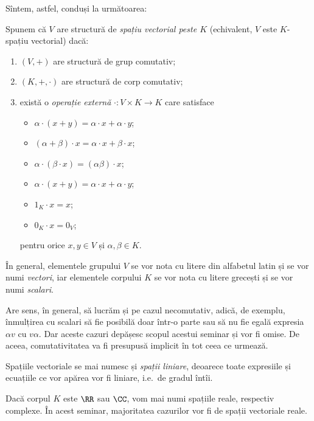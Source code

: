 Sîntem, astfel, conduși la următoarea:
\begin{definition}\label{def:sp-vect}
    Spunem că $ V $ are structură de \emph{spațiu vectorial peste $ K $} (echivalent,
    $ V $ este $ K $-spațiu vectorial) dacă:
    \begin{enumerate}
        \item $ (V, +) $ are structură de grup comutativ;
        \item $ (K, +, \cdot) $ are structură de corp comutativ;
        \item există o \emph{operație externă} $ \cdot : V \times K \to K $ care satisface
            \begin{itemize}
                \item $ \alpha \cdot (x + y) = \alpha \cdot x + \alpha \cdot y $;
                \item $ (\alpha + \beta) \cdot x = \alpha \cdot x + \beta \cdot x $;
                \item $ \alpha \cdot (\beta \cdot x) = (\alpha \beta) \cdot x $;
                \item $ \alpha \cdot (x + y) = \alpha \cdot x + \alpha \cdot y $;
                \item $ 1_K \cdot x = x $;
                \item $ 0_K \cdot x = 0_V $;
            \end{itemize}
            pentru orice $ x, y \in V $ și $ \alpha, \beta \in K $.
    \end{enumerate}
    În general, elementele grupului $ V $ se vor nota cu litere din alfabetul latin
    și se vor numi \emph{vectori}, iar elementele corpului $ K $ se vor nota cu litere
    grecești și se vor numi \emph{scalari}.
\end{definition}

\begin{remark}\label{rk:spatiu-necom}
    Are sens, în general, să lucrăm și pe cazul necomutativ, adică, de exemplu,
    înmulțirea cu scalari să fie posibilă doar într-o parte sau să nu fie egală expresia
    $ \alpha v $ cu $ v \alpha $. Dar aceste cazuri depășesc scopul acestui seminar și vor
    fi omise. De aceea, comutativitatea va fi presupusă implicit în tot ceea ce urmează.
\end{remark}

Spațiile vectoriale se mai numesc și \emph{spații liniare}, deoarece toate expresiile
și ecuațiile ce vor apărea vor fi liniare, i.e.\ de gradul întîi.

Dacă corpul $ K $ este $ \RR $ sau $ \CC $, vom mai numi spațiile reale, respectiv complexe.
În acest seminar, majoritatea cazurilor vor fi de spații vectoriale reale.

